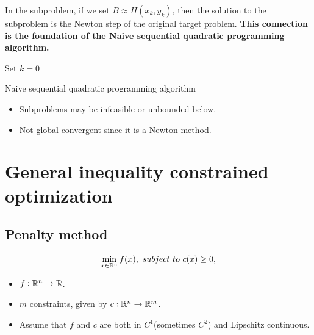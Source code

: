 \begin{refsection}
\begin{note}[implications]
In the subproblem, if we set $B \approx H(x_k,y_k)$, then the solution to the subproblem is the Newton step of the original target problem. \textbf{This connection is the foundation of the Naive sequential quadratic programming algorithm.}
\end{note}

\begin{algorithm}[H]
	\SetAlgoLined
	Set $k = 0$ \\
	\caption{Naive sequential quadratic programming algorithm}
\end{algorithm}

\begin{remark}[weakness]\hfill
\begin{itemize}
	\item Subproblems may be infeasible or unbounded below.
	\item Not global convergent since it is a Newton method.
\end{itemize}
\end{remark}







\section{General inequality constrained optimization}
\subsection{Penalty method}

\begin{definition}
	$$\min_{x\in\mathbb{R}^n} f(x), ~subject~to~c(x) \geq 0,$$
	\begin{itemize}
		\item $f:\mathbb{R}^n\to \mathbb{R}$.
		\item $m$ constraints, given by $c: \mathbb{R}^n \to \mathbb{R}^m$.
		\item Assume that $f$ and $c$ are both in $C^1$(sometimes $C^2$) and Lipschitz continuous.
	\end{itemize}
\end{definition}



\end{refsection}
